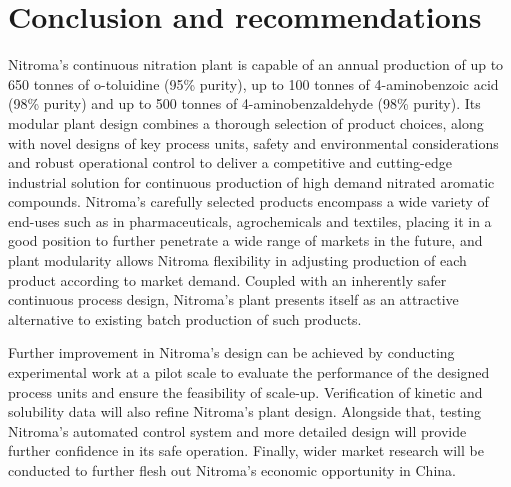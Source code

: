 \section*{Conclusion and recommendations}
Nitroma's continuous nitration plant is capable of an annual production of up to 650 tonnes of o-toluidine (95\% purity), up to 100 tonnes of 4-aminobenzoic acid (98\% purity) and up to 500 tonnes of 4-aminobenzaldehyde (98\% purity). Its modular plant design combines a thorough selection of product choices, along with novel designs of key process units, safety and environmental considerations and robust operational control to deliver a competitive and cutting-edge industrial solution for continuous production of high demand nitrated aromatic compounds. Nitroma's carefully selected products encompass a wide variety of end-uses such as in pharmaceuticals, agrochemicals and textiles, placing it in a good position to further penetrate a wide range of markets in the future, and plant modularity allows Nitroma flexibility in adjusting production of each product according to market demand. Coupled with an inherently safer continuous process design, Nitroma's plant presents itself as an attractive alternative to existing batch production of such products.

Further improvement in Nitroma's design can be achieved by conducting experimental work at a pilot scale to evaluate the performance of the designed process units and ensure the feasibility of scale-up. Verification of kinetic and solubility data will also refine Nitroma's plant design. Alongside that, testing Nitroma's automated control system and more detailed design will provide further confidence in its safe operation. Finally, wider market research will be conducted to further flesh out Nitroma's economic opportunity in China.

